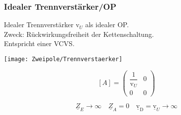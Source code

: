\subsubsection{Idealer Trennverst\"arker/OP} \label{trennverstärker}
Idealer Trennverstärker  $\text{v}_U$ als idealer OP.\\ 
Zweck: Rückwirkungsfreiheit der Kettenschaltung.\\
Entspricht einer VCVS.\\
\begin{minipage}{0.5\columnwidth}
\texttt{[image: Zweipole/Trennverstaerker]}
\end{minipage}
\begin{minipage}{0.5\columnwidth}
	\[
	[A] = \begin{pmatrix}
		\dfrac{1}{\text{v}_U} & 0 \\
		0        & 0
	\end{pmatrix}
	\]
\end{minipage}
\begin{equation*}
	\boxed{
	\underline{Z}_E \rightarrow \infty \quad \underline{Z}_A = 0 \quad \underline{\text{v}}_{\text{D}}=\underline{\text{v}}_U \rightarrow \infty }
\end{equation*}
